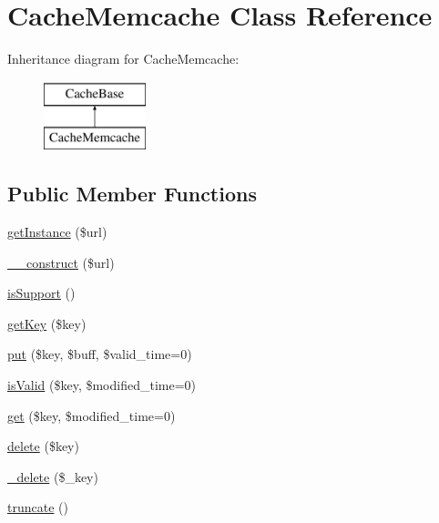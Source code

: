 \hypertarget{classCacheMemcache}{\section{Cache\-Memcache Class Reference}
\label{classCacheMemcache}
}
Inheritance diagram for Cache\-Memcache\-:\begin{figure}[H]
\begin{center}
\leavevmode
\includegraphics[height=2.000000cm]{classCacheMemcache}
\end{center}
\end{figure}
\subsection*{Public Member Functions}
\begin{DoxyCompactItemize}
\item 
\hyperlink{classCacheMemcache_a951aa78ba49fdb971def3e2bb8b7db2e}{get\-Instance} (\$url)
\item 
\hyperlink{classCacheMemcache_a55e4226044a622c526b79e8fe3e5c927}{\-\_\-\-\_\-construct} (\$url)
\item 
\hyperlink{classCacheMemcache_a4ea35bdd7cc26faa01996dbbc162720f}{is\-Support} ()
\item 
\hyperlink{classCacheMemcache_a27f400a936cc3efb152acc12edb379e1}{get\-Key} (\$key)
\item 
\hyperlink{classCacheMemcache_aaf8fbd3ad05138296cb522fe8c133017}{put} (\$key, \$buff, \$valid\-\_\-time=0)
\item 
\hyperlink{classCacheMemcache_af0882957fc5b20e7fb70aeae652920e8}{is\-Valid} (\$key, \$modified\-\_\-time=0)
\item 
\hyperlink{classCacheMemcache_a9a3db7b30c229677ce7c331aa41f9e9a}{get} (\$key, \$modified\-\_\-time=0)
\item 
\hyperlink{classCacheMemcache_aca057fd092e1a938410a20e16d2d2d7f}{delete} (\$key)
\item 
\hyperlink{classCacheMemcache_a8ac0c5d0703aaeaabec2c478984d43fa}{\-\_\-delete} (\$\-\_\-key)
\item 
\hyperlink{classCacheMemcache_a064b47c5872cde9ff686b148bf005849}{truncate} ()
\end{DoxyCompactItemize}
